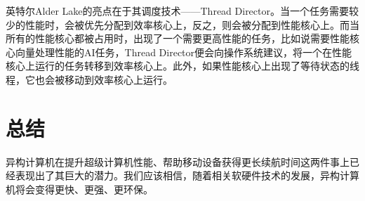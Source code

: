 \documentclass[UTF8,a4paper,10pt]{ctexart}
\begin{document}
英特尔Alder Lake的亮点在于其调度技术——Thread Director。当一个任务需要较少的性能时，会被优先分配到效率核心上，反之，则会被分配到性能核心上。而当所有的性能核心都被占用时，出现了一个需要更高性能的任务，比如说需要性能核心向量处理性能的AI任务，Thread Director便会向操作系统建议，将一个在性能核心上运行的任务转移到效率核心上。此外，如果性能核心上出现了等待状态的线程，它也会被移动到效率核心上运行。\cite{intel_alder_lake}


\section{总结}
异构计算机在提升超级计算机性能、帮助移动设备获得更长续航时间这两件事上已经表现出了其巨大的潜力。我们应该相信，随着相关软硬件技术的发展，异构计算机将会变得更快、更强、更环保。
\newpage

 
\end{document}
